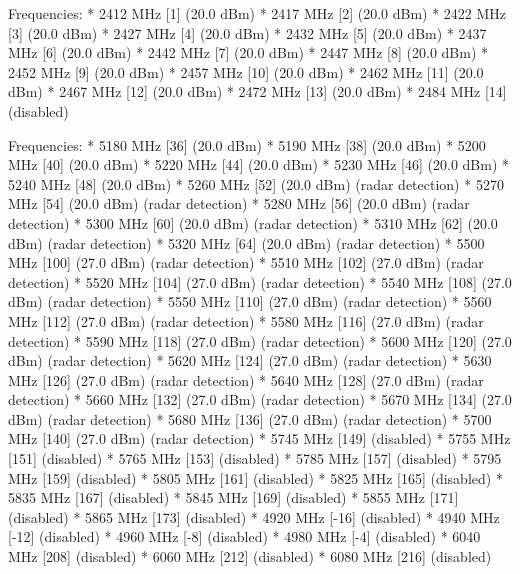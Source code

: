 		Frequencies:
			* 2412 MHz [1] (20.0 dBm)
			* 2417 MHz [2] (20.0 dBm)
			* 2422 MHz [3] (20.0 dBm)
			* 2427 MHz [4] (20.0 dBm)
			* 2432 MHz [5] (20.0 dBm)
			* 2437 MHz [6] (20.0 dBm)
			* 2442 MHz [7] (20.0 dBm)
			* 2447 MHz [8] (20.0 dBm)
			* 2452 MHz [9] (20.0 dBm)
			* 2457 MHz [10] (20.0 dBm)
			* 2462 MHz [11] (20.0 dBm)
			* 2467 MHz [12] (20.0 dBm)
			* 2472 MHz [13] (20.0 dBm)
			* 2484 MHz [14] (disabled)

		Frequencies:
			* 5180 MHz [36] (20.0 dBm)
			* 5190 MHz [38] (20.0 dBm)
			* 5200 MHz [40] (20.0 dBm)
			* 5220 MHz [44] (20.0 dBm)
			* 5230 MHz [46] (20.0 dBm)
			* 5240 MHz [48] (20.0 dBm)
			* 5260 MHz [52] (20.0 dBm) (radar detection)
			* 5270 MHz [54] (20.0 dBm) (radar detection)
			* 5280 MHz [56] (20.0 dBm) (radar detection)
			* 5300 MHz [60] (20.0 dBm) (radar detection)
			* 5310 MHz [62] (20.0 dBm) (radar detection)
			* 5320 MHz [64] (20.0 dBm) (radar detection)
			* 5500 MHz [100] (27.0 dBm) (radar detection)
			* 5510 MHz [102] (27.0 dBm) (radar detection)
			* 5520 MHz [104] (27.0 dBm) (radar detection)
			* 5540 MHz [108] (27.0 dBm) (radar detection)
			* 5550 MHz [110] (27.0 dBm) (radar detection)
			* 5560 MHz [112] (27.0 dBm) (radar detection)
			* 5580 MHz [116] (27.0 dBm) (radar detection)
			* 5590 MHz [118] (27.0 dBm) (radar detection)
			* 5600 MHz [120] (27.0 dBm) (radar detection)
			* 5620 MHz [124] (27.0 dBm) (radar detection)
			* 5630 MHz [126] (27.0 dBm) (radar detection)
			* 5640 MHz [128] (27.0 dBm) (radar detection)
			* 5660 MHz [132] (27.0 dBm) (radar detection)
			* 5670 MHz [134] (27.0 dBm) (radar detection)
			* 5680 MHz [136] (27.0 dBm) (radar detection)
			* 5700 MHz [140] (27.0 dBm) (radar detection)
			* 5745 MHz [149] (disabled)
			* 5755 MHz [151] (disabled)
			* 5765 MHz [153] (disabled)
			* 5785 MHz [157] (disabled)
			* 5795 MHz [159] (disabled)
			* 5805 MHz [161] (disabled)
			* 5825 MHz [165] (disabled)
			* 5835 MHz [167] (disabled)
			* 5845 MHz [169] (disabled)
			* 5855 MHz [171] (disabled)
			* 5865 MHz [173] (disabled)
			* 4920 MHz [-16] (disabled)
			* 4940 MHz [-12] (disabled)
			* 4960 MHz [-8] (disabled)
			* 4980 MHz [-4] (disabled)
			* 6040 MHz [208] (disabled)
			* 6060 MHz [212] (disabled)
			* 6080 MHz [216] (disabled)

